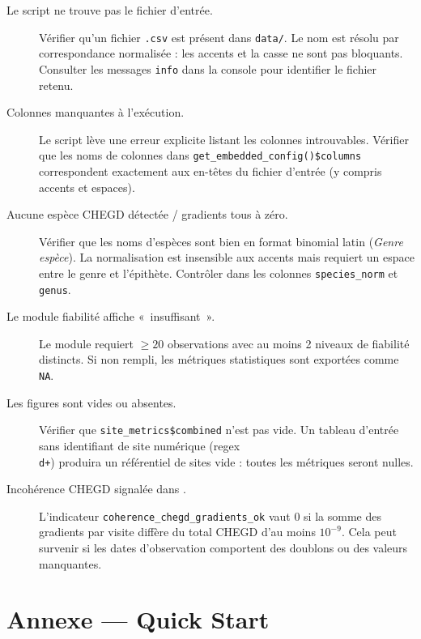 \documentclass[11pt,a4paper]{article}
\begin{document}
\begin{description}
  \item[Le script ne trouve pas le fichier d'entrée.]
    Vérifier qu'un fichier \texttt{.csv} est présent dans \texttt{data/}.
    Le nom est résolu par correspondance normalisée : les accents et la casse ne sont pas bloquants.
    Consulter les messages \texttt{info} dans la console pour identifier le fichier retenu.

  \item[Colonnes manquantes à l'exécution.]
    Le script lève une erreur explicite listant les colonnes introuvables.
    Vérifier que les noms de colonnes dans \texttt{get\_embedded\_config()\$columns} correspondent
    exactement aux en-têtes du fichier d'entrée (y compris accents et espaces).

  \item[Aucune espèce CHEGD détectée / gradients tous à zéro.]
    Vérifier que les noms d'espèces sont bien en format binomial latin (\textit{Genre espèce}).
    La normalisation est insensible aux accents mais requiert un espace entre le genre et l'épithète.
    Contrôler dans  les colonnes \texttt{species\_norm} et \texttt{genus}.

  \item[Le module fiabilité affiche «~insuffisant~».]
    Le module requiert $\geq 20$ observations avec au moins 2 niveaux de fiabilité distincts.
    Si non rempli, les métriques statistiques sont exportées comme \texttt{NA}.

  \item[Les figures sont vides ou absentes.]
    Vérifier que \texttt{site\_metrics\$combined} n'est pas vide.
    Un tableau d'entrée sans identifiant de site numérique (regex \texttt{\\d+})
    produira un référentiel de sites vide : toutes les métriques seront nulles.

  \item[Incohérence CHEGD signalée dans .]
    L'indicateur \texttt{coherence\_chegd\_gradients\_ok} vaut 0 si la somme des gradients par
    visite diffère du total CHEGD d'au moins $10^{-9}$. Cela peut survenir si les dates
    d'observation comportent des doublons ou des valeurs manquantes.
\end{description}

\section*{Annexe — Quick Start}
\end{document}
